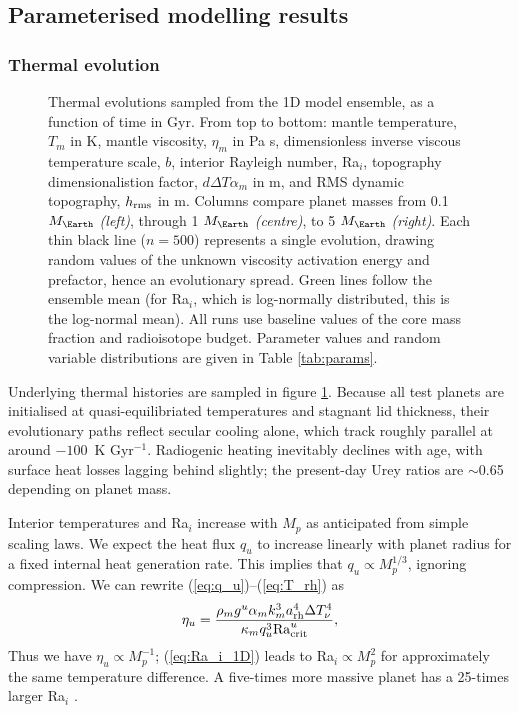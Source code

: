 \documentclass[trackchanges]{aastex63}
\newcommand{\todo}[1]{\textit{\textcolor{violet}{{#1}}}}
\begin{document}
\subsection{Parameterised modelling results}



\subsubsection{Thermal evolution}

\begin{figure}
    \centering
    \caption{Thermal evolutions sampled from the 1D model ensemble, as a function of time in Gyr. From top to bottom: mantle temperature, $T_m$ in K, mantle viscosity, $\eta_m$ in Pa s, dimensionless inverse viscous temperature scale, $b$, interior Rayleigh number, Ra$_i$, topography dimensionalistion factor, $d \Delta T \alpha_m$ in m, and RMS dynamic topography, $h_{\rm rms}$ in m. Columns compare planet masses from 0.1 $M_\Earth$ \textit{(left)}, through 1 $M_\Earth$ \textit{(centre)}, to 5 $M_\Earth$ \textit{(right)}. Each thin black line ($n = 500$) represents a single evolution, drawing random values of the unknown viscosity activation energy and prefactor, hence an evolutionary spread. Green lines follow the ensemble mean (for Ra$_i$, which is log-normally distributed, this is the log-normal mean). All runs use baseline values of the core mass fraction and radioisotope budget. Parameter values and random variable distributions are given in Table \ref{tab:params}.
    }
    \label{fig:1D-evolution}
\end{figure}


Underlying thermal histories are sampled in figure \ref{fig:1D-evolution}. Because all test planets are initialised at quasi-equilibriated temperatures and stagnant lid thickness, their evolutionary paths reflect secular cooling alone, which track roughly parallel at around $-100$~K Gyr$^{-1}$. Radiogenic heating inevitably declines with age, with surface heat losses lagging behind slightly; the present-day Urey ratios are $\sim$0.65 depending on planet mass. 

Interior temperatures and Ra$_i$ increase with $M_p$ as anticipated from simple scaling laws. We expect the heat flux $q_u$ to increase linearly with planet radius for a fixed internal heat generation rate. This implies that $q_u \propto M_p^{1/3}$, ignoring compression. We can rewrite (\ref{eq:q_u})--(\ref{eq:T_rh}) as
\begin{equation}
    \eta_u = \frac{\rho_m g^u \alpha_m k_m^3 a^4_{\rm rh} \Delta T_\nu^4}{\kappa_m q_u^3 {\rm Ra}^u_{\rm crit}},
\end{equation}
Thus we have $\eta_u \propto M_p^{-1}$; (\ref{eq:Ra_i_1D}) leads to Ra$_i \propto M_p^2$ for approximately the same temperature difference. A five-times more massive planet has a 25-times larger Ra$_i$ \citep[see also][]{stevenson_les_2003,  kite_geodynamics_2009}.
\end{document}
